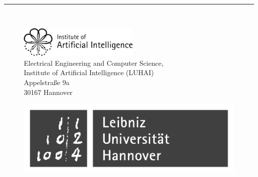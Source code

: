 %
\begin{titlepage}
  \flushright
  \hfill
  \vfill
  {\LARGE\thesisTitle \par}
  \rule[5pt]{\textwidth}{.4pt} \par
  {\Large\thesisName}
  \vfill
  \textit{\large\thesisDate} \\
\end{titlepage}




\begin{titlepage}

  \tgherosfont

  \begin{figure}
    \begin{minipage}[t]{8.5cm}
      \includegraphics[height=1.5cm]{figures/LUHAI_banner.png}\\
      \textsf{\small{Electrical Engineering and Computer Science,\\
          Institute of Artificial Intelligence (LUHAI)\\
          Appelstraße 9a \\
          30167 Hannover
        }}
    \end{minipage}
    \hfill
    \begin{minipage}[t]{4.7cm}
      \includegraphics[scale=0.3]{figures/luh_logo_grey.pdf}\\
      \textsf{%
        \hspace*{0.1cm}\small{}
      }
    \end{minipage}
  \end{figure}


\end{titlepage}
